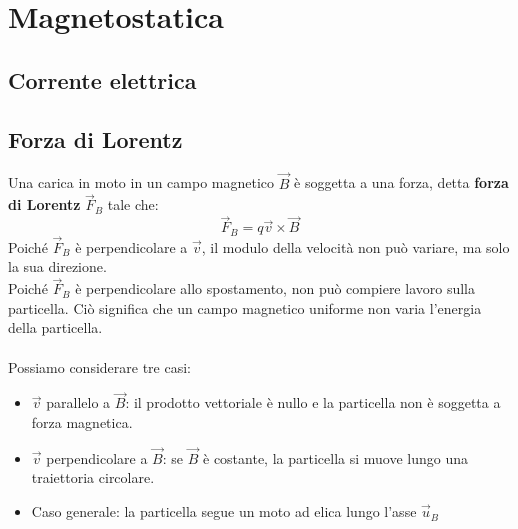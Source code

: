 \chapter{Magnetostatica}

\section{Corrente elettrica}


\section{Forza di Lorentz}
Una carica in moto in un campo magnetico $\vec{B}$ è soggetta a una forza, detta \textbf{forza di Lorentz} $\vec{F}_B$ tale che:
\begin{displaymath}
	\vec{F}_B = q \vec{v} \times \vec{B}
\end{displaymath}
Poiché $\vec{F}_B$ è perpendicolare a $\vec{v}$, il modulo della velocità non può variare, ma solo la sua direzione.\\
Poiché $\vec{F}_B$ è perpendicolare allo spostamento, non può compiere lavoro sulla particella. Ciò significa che un campo magnetico uniforme non varia l'energia della particella.\\\\
Possiamo considerare tre casi:
\begin{itemize}
	\item{$\vec{v}$ parallelo a $\vec{B}$: il prodotto vettoriale è nullo e la particella non è soggetta a forza magnetica.}
    \item{$\vec{v}$ perpendicolare a $\vec{B}$: se $\vec{B}$ è costante, la particella si muove lungo una traiettoria circolare.}
    \item{Caso generale: la particella segue un moto ad elica lungo l'asse $\vec{u}_B$}
\end{itemize}

